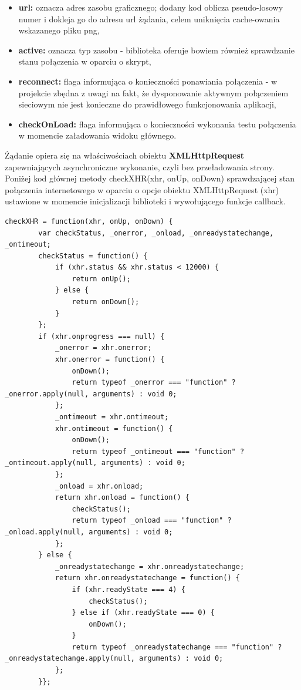 \begin{itemize}
\item \textbf{url:} oznacza adres zasobu graficznego; dodany kod oblicza pseudo-losowy numer i dokleja go do adresu url żądania, celem uniknięcia cache-owania wskazanego pliku png,
\item \textbf{active:} oznacza typ zasobu - biblioteka oferuje bowiem również sprawdzanie stanu połączenia w oparciu o skrypt,
\item \textbf{reconnect:} flaga informująca o konieczności ponawiania połączenia - w projekcie zbędna z uwagi na fakt, że dysponowanie aktywnym połączeniem sieciowym nie jest konieczne do prawidłowego funkcjonowania aplikacji,
\item \textbf{checkOnLoad:} flaga informująca o konieczności wykonania testu połączenia w momencie załadowania widoku głównego.
\end{itemize}

Żądanie opiera się na właściwościach obiektu \textbf{XMLHttpRequest} zapewniających asynchroniczne wykonanie, czyli bez przeładowania strony. Poniżej kod głównej metody checkXHR(xhr, onUp, onDown) sprawdzającej stan połączenia internetowego w oparciu o opcje obiektu XMLHttpRequest (xhr) ustawione w momencie inicjalizacji biblioteki i wywołującego funkcje callback.

\begin{lstlisting}[caption=Metoda checkXHR() wykonująca żądanie AJAX załadowania zasobu graficznego., label=amb, captionpos=b]
checkXHR = function(xhr, onUp, onDown) {
        var checkStatus, _onerror, _onload, _onreadystatechange, _ontimeout;
        checkStatus = function() {
            if (xhr.status && xhr.status < 12000) {
                return onUp();
            } else {
                return onDown();
            }
        };
        if (xhr.onprogress === null) {
            _onerror = xhr.onerror;
            xhr.onerror = function() {
                onDown();
                return typeof _onerror === "function" ? _onerror.apply(null, arguments) : void 0;
            };
            _ontimeout = xhr.ontimeout;
            xhr.ontimeout = function() {
                onDown();
                return typeof _ontimeout === "function" ? _ontimeout.apply(null, arguments) : void 0;
            };
            _onload = xhr.onload;
            return xhr.onload = function() {
                checkStatus();
                return typeof _onload === "function" ? _onload.apply(null, arguments) : void 0;
            };
        } else {
            _onreadystatechange = xhr.onreadystatechange;
            return xhr.onreadystatechange = function() {
                if (xhr.readyState === 4) {
                    checkStatus();
                } else if (xhr.readyState === 0) {
                    onDown();
                }
                return typeof _onreadystatechange === "function" ? _onreadystatechange.apply(null, arguments) : void 0;
            };
        }};
\end{lstlisting}

